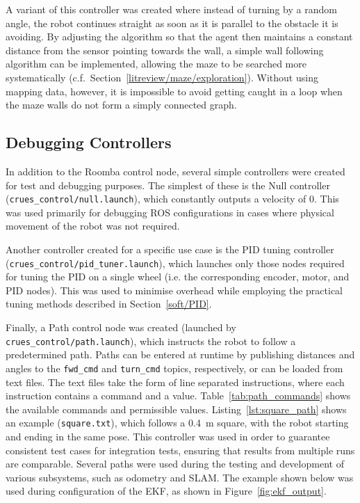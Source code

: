 A variant of this controller was created where instead of turning by a random
angle, the robot continues straight as soon as it is parallel to the obstacle
it is avoiding. By adjusting the algorithm so that the agent then
maintains a constant distance from the sensor pointing towards the wall, a
simple wall following algorithm can be implemented, allowing the maze to be
searched more systematically (c.f.\ Section~\ref{litreview/maze/exploration}).
Without using mapping data, however, it is impossible to avoid getting caught
in a loop when the maze walls do not form a simply connected graph.


\subsection{Debugging Controllers}\label{soft/control/debug}

In addition to the Roomba control node, several simple controllers were created
for test and debugging purposes. The simplest of these is the Null controller
(\verb|crues_control/null.launch|), which constantly outputs a velocity of 0.
This was used primarily for debugging ROS configurations in cases where
physical movement of the robot was not required.

Another controller created for a specific use case is the PID tuning controller
(\verb|crues_control/pid_tuner.launch|), which launches only those nodes
required for tuning the PID on a single wheel (i.e. the corresponding encoder,
motor, and PID nodes). This was used to minimise overhead while employing the
practical tuning methods described in Section~\ref{soft/PID}.

Finally, a Path control node was created (launched by
\verb|crues_control/path.launch|), which instructs the robot to follow a
predetermined path. Paths can be entered at runtime by
publishing distances and angles to the \verb|fwd_cmd| and \verb|turn_cmd|
topics, respectively, or can be loaded from text files. The text files take
the form of line separated instructions, where each instruction contains a
command and a value. Table~\ref{tab:path_commands} shows the
available commands and permissible values.
Listing~\ref{lst:square_path} shows an example (\verb|square.txt|), which
follows a \SI{0.4}{\metre} square, with the robot starting and ending in the
same pose. This controller was used in order to guarantee consistent test
cases for integration tests, ensuring that results from multiple runs are
comparable. Several paths were used during the testing and development of
various subsystems, such as odometry and SLAM. The example shown below was
used during configuration of the EKF, as shown in Figure~\ref{fig:ekf_output}.


